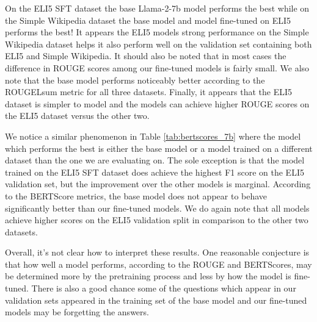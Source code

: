 \documentclass[11pt, oneside]{article}   	%
\begin{document}
On the ELI5 SFT dataset the base Llama-2-7b model performs the best while on the Simple Wikipedia dataset the base model and model fine-tuned on ELI5 performs the best!
It appears the ELI5 models strong performance on the Simple Wikipedia dataset helps it also perform well on the validation set containing both ELI5 and Simple Wikipedia.
It should also be noted that in most cases the difference in ROUGE scores among our fine-tuned models is fairly small.
We also note that the base model performs noticeably better according to the ROUGELsum metric for all three datasets.
Finally, it appears that the ELI5 dataset is simpler to model and the models can achieve higher ROUGE scores on the ELI5 dataset versus the other two.

We notice a similar phenomenon in Table \ref{tab:bertscores_7b} where the model which performs the best is either the base model or a model trained on a different dataset than the one we are evaluating on.
The sole exception is that the model trained on the ELI5 SFT dataset does achieve the highest F1 score on the ELI5 validation set, but the improvement over the other models is marginal.
According to the BERTScore metrics, the base model does not appear to behave significantly better than our fine-tuned models.
We do again note that all models achieve higher scores on the ELI5 validation split in comparison to the other two datasets. 

Overall, it's not clear how to interpret these results.
One reasonable conjecture is that how well a model performs, according to the ROUGE and BERTScores, may be determined more by the pretraining process and less by how the model is fine-tuned.
There is also a good chance some of the questions which appear in our validation sets appeared in the training set of the base model and our fine-tuned models may be forgetting the answers.

\end{document}
